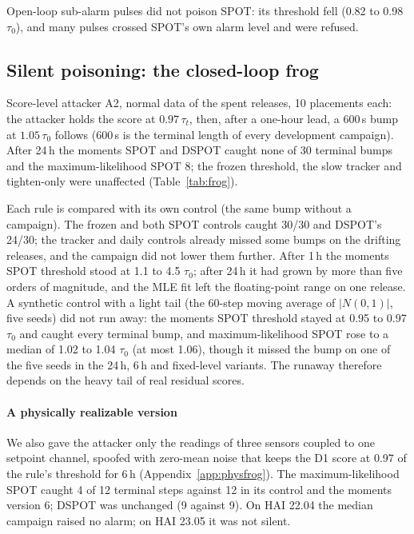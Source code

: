 \documentclass[sigconf]{acmart}
\begin{document}
Open-loop sub-alarm pulses did not poison SPOT: its threshold fell (0.82 to 0.98 $\tau_0$), and many
pulses crossed SPOT's own alarm level and were refused.


\subsection{Silent poisoning: the closed-loop frog}
\label{sec:frog}

Score-level attacker A2, normal data of the spent releases, 10 placements each: the attacker holds
the score at $0.97\,\tau_t$, then, after a one-hour lead, a 600\,s bump at $1.05\,\tau_0$ follows
(600\,s is the terminal length of every development campaign). After 24\,h the moments SPOT and
DSPOT caught none of 30 terminal bumps and the maximum-likelihood SPOT 8; the frozen threshold, the slow
tracker and tighten-only were unaffected (Table~\ref{tab:frog}).


Each rule is compared with its own control (the same bump without a campaign). The frozen and both
SPOT controls caught 30/30 and DSPOT's 24/30; the tracker and daily controls already missed some
bumps on the drifting releases, and the campaign did not lower them further. After 1\,h the moments
SPOT threshold stood at 1.1 to 4.5 $\tau_0$; after 24\,h it had grown by more than five orders of
magnitude, and the MLE fit left the floating-point range on one release. A synthetic control with a
light tail (the 60-step moving average of $|N(0, 1)|$, five seeds) did not run away: the moments SPOT
threshold stayed at 0.95 to 0.97 $\tau_0$ and caught every terminal bump, and maximum-likelihood SPOT
rose to a median of 1.02 to 1.04 $\tau_0$ (at most 1.06), though it missed the bump on one of the five seeds in the 24\,h,
6\,h and fixed-level variants. The runaway therefore depends on the heavy tail of real residual
scores.

\paragraph{A physically realizable version}
We also gave the attacker only the readings of three sensors coupled to one setpoint channel, spoofed
with zero-mean noise that keeps the D1 score at 0.97 of the rule's threshold for 6\,h
(Appendix~\ref{app:physfrog}). The maximum-likelihood SPOT caught 4 of 12 terminal steps against 12 in
its control and the moments version 6; DSPOT was unchanged (9 against 9). On HAI 22.04 the median
campaign raised no alarm; on HAI 23.05 it was not silent.
\end{document}

